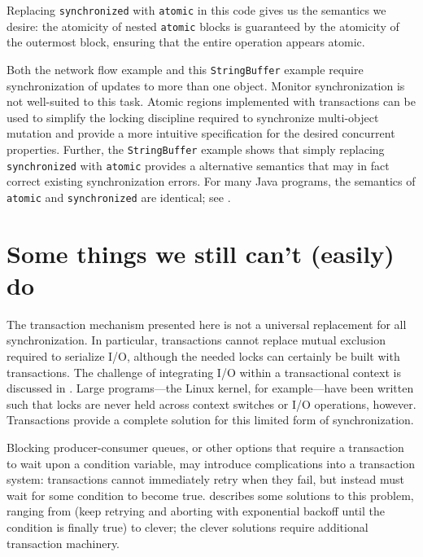 Replacing {\tt synchronized} with {\tt atomic} in
this code gives us the semantics
we desire: the atomicity of nested {\tt atomic} blocks is guaranteed
by the atomicity of the outermost block, ensuring that the entire
operation appears atomic.

Both the network flow example and this {\tt StringBuffer} example require
synchronization of
updates to more than one object.
Monitor synchronization is not
well-suited to this task.  Atomic regions implemented with
transactions can be used to simplify the locking discipline required
to synchronize multi-object mutation
and provide a more intuitive specification for the desired
concurrent properties.  Further, the {\tt StringBuffer} example shows
that simply replacing {\tt synchronized} with {\tt atomic} provides a
alternative semantics that may in fact correct existing
synchronization errors.
For many Java programs, the
semantics of {\tt atomic} and {\tt synchronized} are identical; see
.

\section{Some things we still can't (easily) do}\label{sec:xlimit}
The transaction mechanism presented here is not a universal
replacement for all synchronization.  In particular, transactions
cannot replace mutual exclusion
required to serialize I/O, although the needed locks can certainly be
built with transactions.  
The challenge of integrating I/O within a
transactional context is discussed in .
Large programs---the
Linux kernel, for example---have been
written such that locks are
never held across context switches or I/O operations, however.  Transactions
provide a complete solution for this limited form of synchronization.

Blocking producer-consumer queues, or other options that require a
transaction to wait upon a condition variable, may introduce
complications into a transaction system: transactions cannot
immediately retry when they fail, but instead must wait for some
condition to become true.   describes some
solutions to this problem, ranging from \naive (keep retrying and
aborting with exponential backoff until the condition is finally true)
to clever; the clever solutions require additional transaction
machinery.



